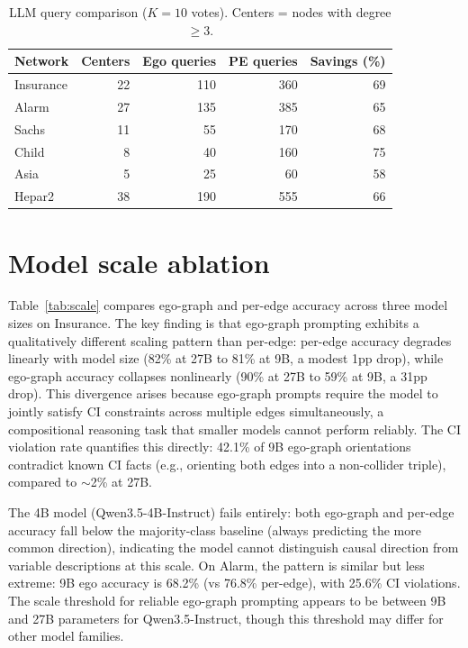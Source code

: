 \documentclass{article}
\begin{document}
\begin{table}[h]
\centering
\caption{LLM query comparison ($K{=}10$ votes). Centers = nodes with degree $\geq 3$.}
\small
\begin{tabular}{lrrrr}
\toprule
Network & Centers & Ego queries & PE queries & Savings (\%) \\
\midrule
Insurance & 22 & 110 & 360 & 69 \\
Alarm     & 27 & 135 & 385 & 65 \\
Sachs     & 11 & 55  & 170 & 68 \\
Child     & 8  & 40  & 160 & 75 \\
Asia      & 5  & 25  & 60  & 58 \\
Hepar2    & 38 & 190 & 555 & 66 \\
\bottomrule
\end{tabular}
\end{table}

\section{Model scale ablation}
\label{app:scale}

Table~\ref{tab:scale} compares ego-graph and per-edge accuracy across three model sizes on Insurance. The key finding is that ego-graph prompting exhibits a qualitatively different scaling pattern than per-edge: per-edge accuracy degrades linearly with model size (82\% at 27B to 81\% at 9B, a modest 1pp drop), while ego-graph accuracy collapses nonlinearly (90\% at 27B to 59\% at 9B, a 31pp drop). This divergence arises because ego-graph prompts require the model to jointly satisfy CI constraints across multiple edges simultaneously, a compositional reasoning task that smaller models cannot perform reliably. The CI violation rate quantifies this directly: 42.1\% of 9B ego-graph orientations contradict known CI facts (e.g., orienting both edges into a non-collider triple), compared to $\sim$2\% at 27B.

The 4B model (Qwen3.5-4B-Instruct) fails entirely: both ego-graph and per-edge accuracy fall below the majority-class baseline (always predicting the more common direction), indicating the model cannot distinguish causal direction from variable descriptions at this scale. On Alarm, the pattern is similar but less extreme: 9B ego accuracy is 68.2\% (vs 76.8\% per-edge), with 25.6\% CI violations. The scale threshold for reliable ego-graph prompting appears to be between 9B and 27B parameters for Qwen3.5-Instruct, though this threshold may differ for other model families.
\end{document}
